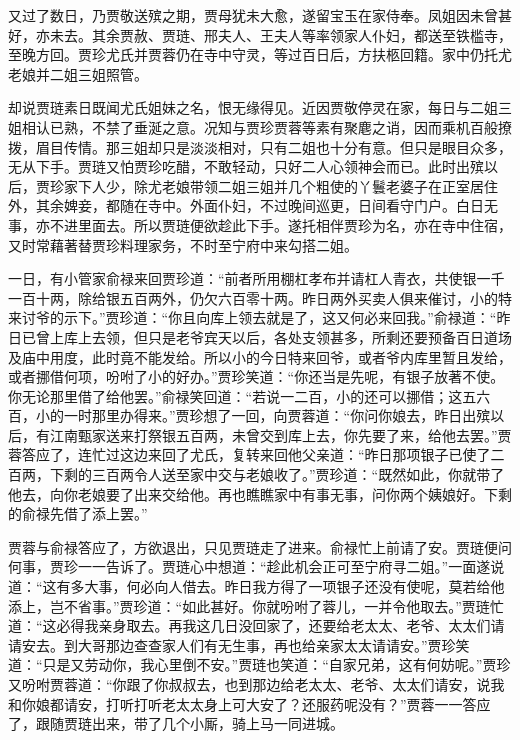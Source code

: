 \begin{parag}
    又过了数日，乃贾敬送殡之期，贾母犹未大愈，遂留宝玉在家侍奉。凤姐因未曾甚好，亦未去。其余贾赦、贾琏、邢夫人、王夫人等率领家人仆妇，都送至铁槛寺，至晚方回。贾珍尤氏并贾蓉仍在寺中守灵，等过百日后，方扶柩回籍。家中仍托尤老娘并二姐三姐照管。
\end{parag}


\begin{parag}
    却说贾琏素日既闻尤氏姐妹之名，恨无缘得见。近因贾敬停灵在家，每日与二姐三姐相认已熟，不禁了垂涎之意。况知与贾珍贾蓉等素有聚麀之诮，因而乘机百般撩拨，眉目传情。那三姐却只是淡淡相对，只有二姐也十分有意。但只是眼目众多，无从下手。贾琏又怕贾珍吃醋，不敢轻动，只好二人心领神会而已。此时出殡以后，贾珍家下人少，除尤老娘带领二姐三姐并几个粗使的丫鬟老婆子在正室居住外，其余婢妾，都随在寺中。外面仆妇，不过晚间巡更，日间看守门户。白日无事，亦不进里面去。所以贾琏便欲趁此下手。遂托相伴贾珍为名，亦在寺中住宿，又时常藉著替贾珍料理家务，不时至宁府中来勾搭二姐。
\end{parag}


\begin{parag}
    一日，有小管家俞禄来回贾珍道：“前者所用棚杠孝布并请杠人青衣，共使银一千一百十两，除给银五百两外，仍欠六百零十两。昨日两外买卖人俱来催讨，小的特来讨爷的示下。”贾珍道：“你且向库上领去就是了，这又何必来回我。”俞禄道：“昨日已曾上库上去领，但只是老爷宾天以后，各处支领甚多，所剩还要预备百日道场及庙中用度，此时竟不能发给。所以小的今日特来回爷，或者爷内库里暂且发给，或者挪借何项，吩咐了小的好办。”贾珍笑道：“你还当是先呢，有银子放著不使。你无论那里借了给他罢。”俞禄笑回道：“若说一二百，小的还可以挪借；这五六百，小的一时那里办得来。”贾珍想了一回，向贾蓉道：“你问你娘去，昨日出殡以后，有江南甄家送来打祭银五百两，未曾交到库上去，你先要了来，给他去罢。”贾蓉答应了，连忙过这边来回了尤氏，复转来回他父亲道：“昨日那项银子已使了二百两，下剩的三百两令人送至家中交与老娘收了。”贾珍道：“既然如此，你就带了他去，向你老娘要了出来交给他。再也瞧瞧家中有事无事，问你两个姨娘好。下剩的俞禄先借了添上罢。”
\end{parag}


\begin{parag}
    贾蓉与俞禄答应了，方欲退出，只见贾琏走了进来。俞禄忙上前请了安。贾琏便问何事，贾珍一一告诉了。贾琏心中想道：“趁此机会正可至宁府寻二姐。”一面遂说道：“这有多大事，何必向人借去。昨日我方得了一项银子还没有使呢，莫若给他添上，岂不省事。”贾珍道：“如此甚好。你就吩咐了蓉儿，一并令他取去。”贾琏忙道：“这必得我亲身取去。再我这几日没回家了，还要给老太太、老爷、太太们请请安去。到大哥那边查查家人们有无生事，再也给亲家太太请请安。”贾珍笑道：“只是又劳动你，我心里倒不安。”贾琏也笑道：“自家兄弟，这有何妨呢。”贾珍又吩咐贾蓉道：“你跟了你叔叔去，也到那边给老太太、老爷、太太们请安，说我和你娘都请安，打听打听老太太身上可大安了？还服药呢没有？”贾蓉一一答应了，跟随贾琏出来，带了几个小厮，骑上马一同进城。
\end{parag}


